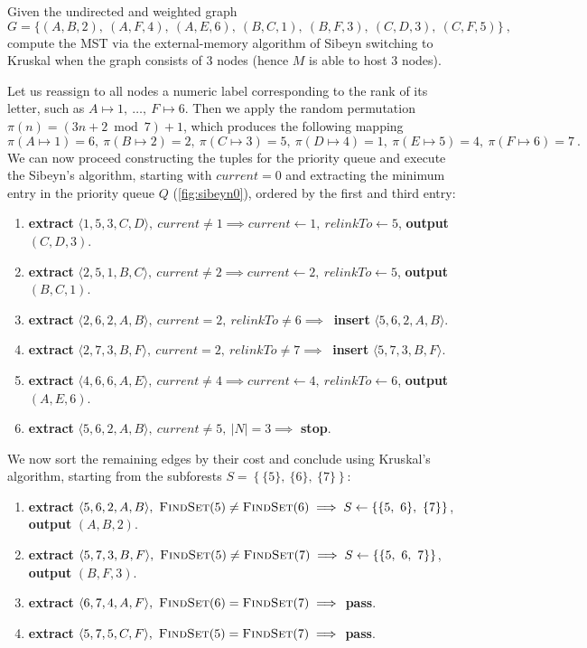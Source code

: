 \exercise

Given the undirected and weighted graph  $$G = \big\{ (A,B,2),\ (A,F,4),\ (A,E,6),\
(B,C,1),\ (B,F,3),\ (C,D,3),\ (C,F,5) \big\}\ ,$$ compute the MST via the
external-memory algorithm of Sibeyn switching to Kruskal when the graph consists
of 3 nodes (hence $M$ is able to host 3 nodes).

\solution

Let us reassign to all nodes a numeric label corresponding to the rank of its
letter, such as $A \mapsto 1,\ \dots,\ F \mapsto 6$. Then we apply the random
permutation $\pi(n) = \left( 3n + 2 \bmod 7 \right) + 1$, which produces the
following mapping $$\pi(A \mapsto 1) = 6,\ \pi(B \mapsto 2) = 2,\ \pi(C \mapsto
3) = 5,\ \pi(D \mapsto 4) = 1,\ \pi(E \mapsto 5) = 4,\ \pi(F \mapsto 6) = 7\ .$$
We can now proceed constructing the tuples for the priority queue and execute
the Sibeyn's algorithm, starting with $current = 0$ and extracting the minimum
entry in the priority queue $Q$ (\autoref{fig:sibeyn0}), ordered by the first
and third entry:
%
\begin{enumerate}
  \item {\bf extract} $\langle 1,5,3,C,D \rangle,\ current \neq 1 \implies current \gets 1,\ relinkTo \gets 5$, {\bf output} $(C,D,3)$.
  \item {\bf extract} $\langle 2,5,1,B,C \rangle,\ current \neq 2 \implies current \gets 2,\ relinkTo \gets 5$, {\bf output} $(B,C,1)$.
  \item {\bf extract} $\langle 2,6,2,A,B \rangle,\ current = 2,\ relinkTo \neq 6 \implies\ $ {\bf insert}  $\langle 5,6,2,A,B \rangle$.
  \item {\bf extract} $\langle 2,7,3,B,F \rangle,\ current = 2,\ relinkTo \neq 7 \implies\ $ {\bf insert}  $\langle 5,7,3,B,F \rangle$.
  \item {\bf extract} $\langle 4,6,6,A,E \rangle,\ current \neq 4 \implies current \gets 4,\ relinkTo \gets 6$, {\bf output} $(A,E,6)$.
  \item {\bf extract} $\langle 5,6,2,A,B \rangle,\ current \neq 5,\ |N| = 3 \implies $ {\bf stop}.
\end{enumerate}
%
We now sort the remaining edges by their cost and conclude using Kruskal's
algorithm, starting from the subforests $S = \left\{\{5\},\ \{6\},\ \{7\}\right\}$:
%
\begin{enumerate}
  \item {\bf extract} $\langle 5,6,2,A,B \rangle,\ \text{\sc FindSet}(5) \neq \text{\sc FindSet}(6) \implies S \gets \left\{\{5,\ 6\},\ \{7\}\right\}$, {\bf output} $(A,B,2)$.
  \item {\bf extract} $\langle 5,7,3,B,F \rangle,\ \text{\sc FindSet}(5) \neq \text{\sc FindSet}(7) \implies S \gets \left\{\{5,\ 6,\ 7\}\right\}$, {\bf output} $(B,F,3)$.
  \item {\bf extract} $\langle 6,7,4,A,F \rangle,\ \text{\sc FindSet}(6) = \text{\sc FindSet}(7) \implies $ {\bf pass}.
  \item {\bf extract} $\langle 5,7,5,C,F \rangle,\ \text{\sc FindSet}(5) = \text{\sc FindSet}(7) \implies $ {\bf pass}.
\end{enumerate}
